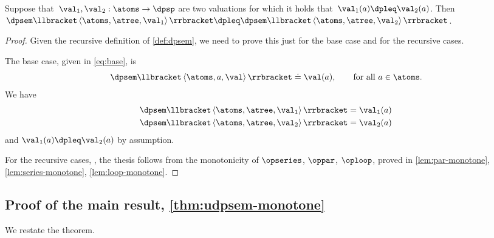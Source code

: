 \begin{lemma}
    \label{lem:dpsem-monotone}Suppose that~$\val_{1},\val_{2}:\atoms\rightarrow\dpsp$
    are two valuations for which it holds that~$\val_{1}(a)\dpleq\val_{2}(a)$.
    Then~$\dpsem\llbracket\left\langle \atoms,\atree,\val_{1}\right\rangle \rrbracket\dpleq\dpsem\llbracket\left\langle \atoms,\atree,\val_{2}\right\rangle \rrbracket$.
\end{lemma}
\begin{proof}
    Given the recursive definition of \cref{def:dpsem}, we need
    to prove this just for the base case and for the recursive cases.

    The base case, given in \cref{eq:base}, is
    \[
        \dpsem\llbracket\left\langle \atoms,a,\val\right\rangle \rrbracket\doteq\val(a),\qquad\text{for all}\ a\in\atoms.
    \]
    We have
    \begin{align*}
        \dpsem\llbracket\left\langle \atoms,\atree,\val_{1}\right\rangle \rrbracket & =\val_{1}(a)\\
        \dpsem\llbracket\left\langle \atoms,\atree,\val_{2}\right\rangle \rrbracket & =\val_{2}(a)
    \end{align*}
    and $\val_{1}(a)\dpleq\val_{2}(a)$ by assumption.

    For the recursive cases, ,
    the thesis follows from the monotonicity of $\opseries$, $\oppar$,
    $\oploop$, proved in \cref{lem:par-monotone}, \cref{lem:series-monotone},
    \cref{lem:loop-monotone}.
\end{proof}

\subsection{Proof of the main result, \cref{thm:udpsem-monotone}}

\label{subsec:proof-main-result}

We restate the theorem.

